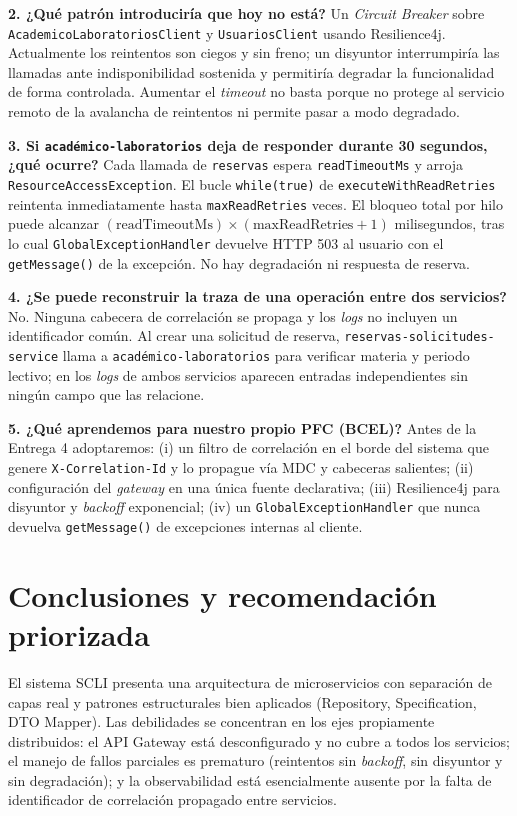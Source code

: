 \documentclass[11pt,a4paper]{article}
\begin{document}
\textbf{2. ¿Qué patrón introduciría que hoy no está?} Un \emph{Circuit
Breaker} sobre \texttt{AcademicoLaboratoriosClient} y \texttt{UsuariosClient}
usando Resilience4j. Actualmente los reintentos son ciegos y sin freno; un
disyuntor interrumpiría las llamadas ante indisponibilidad sostenida y
permitiría degradar la funcionalidad de forma controlada. Aumentar el
\emph{timeout} no basta porque no protege al servicio remoto de la avalancha
de reintentos ni permite pasar a modo degradado.

\textbf{3. Si \texttt{académico-laboratorios} deja de responder durante 30
segundos, ¿qué ocurre?} Cada llamada de \texttt{reservas} espera
\texttt{readTimeoutMs} y arroja \texttt{ResourceAccessException}. El bucle
\texttt{while(true)} de \texttt{executeWithReadRetries} reintenta
inmediatamente hasta \texttt{maxReadRetries} veces. El bloqueo total por
hilo puede alcanzar
$(\text{readTimeoutMs}) \times (\text{maxReadRetries}+1)$ milisegundos, tras
lo cual \texttt{GlobalExceptionHandler} devuelve HTTP 503 al usuario con el
\texttt{getMessage()} de la excepción. No hay degradación ni respuesta de
reserva.

\textbf{4. ¿Se puede reconstruir la traza de una operación entre dos
servicios?} No. Ninguna cabecera de correlación se propaga y los \emph{logs}
no incluyen un identificador común. Al crear una solicitud de reserva,
\texttt{reservas-solicitudes-service} llama a
\texttt{académico-laboratorios} para verificar materia y periodo lectivo;
en los \emph{logs} de ambos servicios aparecen entradas independientes sin
ningún campo que las relacione.

\textbf{5. ¿Qué aprendemos para nuestro propio PFC (BCEL)?} Antes de la
Entrega 4 adoptaremos: (i) un filtro de correlación en el borde del sistema
que genere \texttt{X-Correlation-Id} y lo propague vía MDC y cabeceras
salientes; (ii) configuración del \emph{gateway} en una única fuente
declarativa; (iii) Resilience4j para disyuntor y \emph{backoff} exponencial;
(iv) un \texttt{GlobalExceptionHandler} que nunca devuelva
\texttt{getMessage()} de excepciones internas al cliente.

\section{Conclusiones y recomendación priorizada}

El sistema SCLI presenta una arquitectura de microservicios con separación
de capas real y patrones estructurales bien aplicados (Repository,
Specification, DTO Mapper). Las debilidades se concentran en los ejes
propiamente distribuidos: el API Gateway está desconfigurado y no cubre a
todos los servicios; el manejo de fallos parciales es prematuro (reintentos
sin \emph{backoff}, sin disyuntor y sin degradación); y la observabilidad
está esencialmente ausente por la falta de identificador de correlación
propagado entre servicios.
\end{document}
